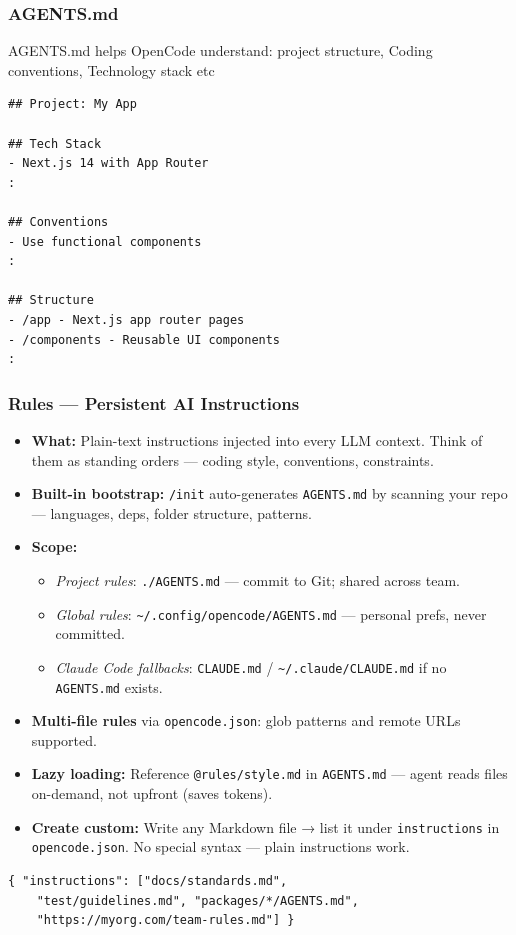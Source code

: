 \begin{frame}[fragile]\frametitle{AGENTS.md}
AGENTS.md helps OpenCode understand: project structure, Coding conventions, Technology stack etc

\begin{lstlisting}
## Project: My App

## Tech Stack
- Next.js 14 with App Router
:

## Conventions
- Use functional components
:

## Structure
- /app - Next.js app router pages
- /components - Reusable UI components
:
\end{lstlisting}
\end{frame}

\begin{frame}[fragile]\frametitle{Rules — Persistent AI Instructions}
  \begin{itemize}
    \item \textbf{What:} Plain-text instructions injected into every LLM context. Think of them as standing orders — coding style, conventions, constraints.
    \item \textbf{Built-in bootstrap:} \texttt{/init} auto-generates \texttt{AGENTS.md} by scanning your repo — languages, deps, folder structure, patterns.
    \item \textbf{Scope:}
      \begin{itemize}
        \item \textit{Project rules}: \texttt{./AGENTS.md} — commit to Git; shared across team.
        \item \textit{Global rules}: \texttt{\textasciitilde/.config/opencode/AGENTS.md} — personal prefs, never committed.
        \item \textit{Claude Code fallbacks}: \texttt{CLAUDE.md} / \texttt{\textasciitilde/.claude/CLAUDE.md} if no \texttt{AGENTS.md} exists.
      \end{itemize}
    \item \textbf{Multi-file rules} via \texttt{opencode.json}: glob patterns and remote URLs supported.

    \item \textbf{Lazy loading:} Reference \texttt{@rules/style.md} in \texttt{AGENTS.md} — agent reads files on-demand, not upfront (saves tokens).
    \item \textbf{Create custom:} Write any Markdown file → list it under \texttt{instructions} in \texttt{opencode.json}. No special syntax — plain instructions work.
  \end{itemize}
  
\begin{lstlisting}
{ "instructions": ["docs/standards.md",
    "test/guidelines.md", "packages/*/AGENTS.md",
    "https://myorg.com/team-rules.md"] }
\end{lstlisting}  
\end{frame}

